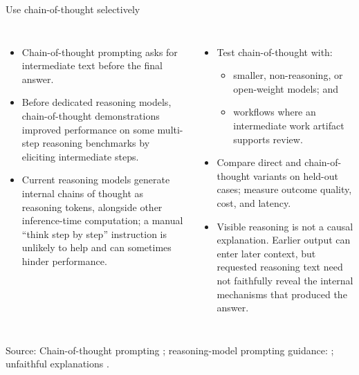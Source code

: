 \documentclass[aspectratio=169]{beamer}
\newcommand{\slidesource}[1]{\vfill{\raggedright\tiny\color{hrgray}Source: #1\par}}
\begin{document}
\begin{frame}{Use chain-of-thought selectively}
\footnotesize
\begin{columns}[T]
\begin{itemize}
  \item Chain-of-thought prompting asks for intermediate text before the final answer.
  \item Before dedicated reasoning models, chain-of-thought demonstrations improved performance on some multi-step reasoning benchmarks by eliciting intermediate steps.
  \item Current reasoning models generate internal chains of thought as reasoning tokens, alongside other inference-time computation; a manual ``think step by step'' instruction is unlikely to help and can sometimes hinder performance.
\end{itemize}
\begin{itemize}
  \item Test chain-of-thought with:
  \begin{itemize}\scriptsize
    \item smaller, non-reasoning, or open-weight models; and
    \item workflows where an intermediate work artifact supports review.
  \end{itemize}
  \item Compare direct and chain-of-thought variants on held-out cases; measure outcome quality, cost, and latency.
  \item Visible reasoning is not a causal explanation. Earlier output can enter later context, but requested reasoning text need not faithfully reveal the internal mechanisms that produced the answer.
\end{itemize}
\end{columns}
\slidesource{Chain-of-thought prompting \parencite{Wei2022ChainThoughtPrompting}; reasoning-model prompting guidance: \textcite{OpenAI2026ReasoningBestPractices}; unfaithful explanations \parencite{Turpin2023UnfaithfulExplanations}.}
\end{frame}
\end{document}
